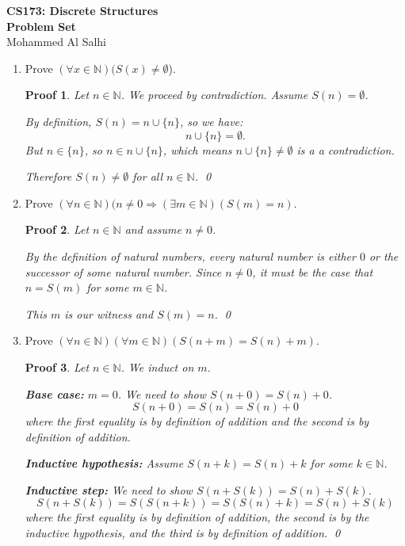 \documentclass[12pt]{article}
\theoremstyle{proofstyle}
\newtheorem*{proof*}{Proof}
\renewcommand{\maketitle}{%
  \begin{flushleft}
    {\Large\bfseries CS173: Discrete Structures}\\[0.3em]
    {\Large\bfseries Problem Set}\\[0.5em]
    {\normalsize Mohammed Al Salhi}
  \end{flushleft}
  \vspace{1em}
}
\begin{document}
\maketitle

\begin{enumerate}[left=0pt, itemsep=2em, parsep=1em]

\item Prove $(\forall x \in \mathbb{N})(S(x) \neq \emptyset$).

\begin{proof*}
    Let $n \in \mathbb{N}$. We proceed by contradiction. Assume $S(n) = \emptyset$.

    By definition, $S(n) = n \cup \{n\}$, so we have:
    \[
        n \cup \{n\} = \emptyset.
    \]
    But $n \in \{n\}$, so $n \in n \cup \{n\}$, which means $n \cup \{n\} \neq \emptyset$ is a 
    a contradiction.

    Therefore $S(n) \neq \emptyset$ for all $n \in \mathbb{N}$. \qed
\end{proof*}

\item Prove $(\forall n \in \mathbb{N})(n \neq 0\Rightarrow (\exists m \in \mathbb{N})(S(m) = n)$.

\begin{proof*}
    Let $n \in \mathbb{N}$ and assume $n \neq 0$.

    By the definition of natural numbers, every natural number is either $0$
    or the successor of some natural number. Since $n \neq 0$, it must be the
    case that $n = S(m)$ for some $m \in \mathbb{N}$.

    This $m$ is our witness and $S(m) = n$. \qed
\end{proof*}

\item Prove $(\forall n \in \mathbb{N})(\forall m \in \mathbb{N})(S(n + m) = S(n) + m)$.

\begin{proof*}
    Let $n \in \mathbb{N}$. We induct on $m$.

    \textbf{Base case:} $m = 0$. We need to show $S(n + 0) = S(n) + 0$.
    \[
        S(n + 0) = S(n) = S(n) + 0
    \]
    where the first equality is by definition of addition and the second is by
    definition of addition.

    \textbf{Inductive hypothesis:} Assume $S(n + k) = S(n) + k$ for some
    $k \in \mathbb{N}$.

    \textbf{Inductive step:} We need to show $S(n + S(k)) = S(n) + S(k)$.
    \[
        S(n + S(k)) = S(S(n + k)) = S(S(n) + k) = S(n) + S(k)
    \]
    where the first equality is by definition of addition, the second is by
    the inductive hypothesis, and the third is by definition of addition. \qed
\end{proof*}


\end{enumerate}
\end{document}

